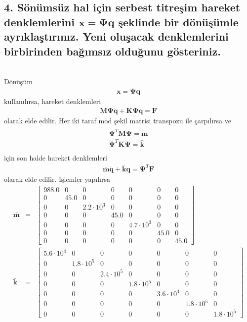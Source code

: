 \documentclass[a4paper]{report}
\begin{document}
\subsection*{4. Sönümsüz hal için serbest titreşim hareket denklemlerini $\mathbf{x}=\mathbf{\Psi}\mathbf{q}$ şeklinde bir dönüşümle ayrıklaştırınız. Yeni oluşacak denklemlerini birbirinden bağımsız olduğunu gösteriniz.}~\\
Dönüşüm
\begin{eqnarray*}
\mathbf{x}=\mathbf{\Psi}\mathbf{q}
\end{eqnarray*}
kullanılırsa, hareket denklemleri
\begin{eqnarray*}
\mathbf{M}\mathbf{\Psi}\ddot{\mathbf{q}} +\mathbf{K}\mathbf{\Psi}\mathbf{q}=\mathbf{F}
\end{eqnarray*}
olarak elde edilir. Her iki taraf mod şekil matrisi transpozu ile çarpılırsa ve
\begin{eqnarray*}
\begin{array}{c}
\mathbf{\Psi}^T\mathbf{M}{\mathbf{\Psi}}=\bar{ \mathbf{m}}\\
\mathbf{\Psi}^T\mathbf{K}{\mathbf{\Psi}}=\bar{ \mathbf{k}}\\
\end{array}
\end{eqnarray*}
için son halde hareket denklemleri
\begin{eqnarray*}
\bar{ \mathbf{m}}\ddot{\mathbf{q}} +\bar {\mathbf{k}}\mathbf{q}=\mathbf{\Psi}^T\mathbf{F}
\end{eqnarray*}
olarak elde edilir. İşlemler yapılırsa
\begin{eqnarray*}
\bar{ \mathbf{m}}&=&\left[\begin{array}{ccccccc} 988.0 & 0 & 0 & 0 & 0 & 0 & 0\\ 0 & 45.0 & 0 & 0 & 0 & 0 & 0\\ 0 & 0 & 2.2\cdot 10^3 & 0 & 0 & 0 & 0\\ 0 & 0 & 0 & 45.0 & 0 & 0 & 0\\ 0 & 0 & 0 & 0 & 4.7\cdot 10^3 & 0 & 0\\ 0 & 0 & 0 & 0 & 0 & 45.0 & 0\\ 0 & 0 & 0 & 0 & 0 & 0 & 45.0 \end{array}\right]\\
\bar{ \mathbf{k}}&=&\left[\begin{array}{ccccccc} 5.6\cdot 10^4 & 0 & 0 & 0 & 0 & 0 & 0\\ 0 & 1.8\cdot 10^5 & 0 & 0 & 0 & 0 & 0\\ 0 & 0 & 2.4\cdot 10^5 & 0 & 0 & 0 & 0\\ 0 & 0 & 0 & 1.8\cdot 10^5 & 0 & 0 & 0\\ 0 & 0 & 0 & 0 & 3.6\cdot 10^4 & 0 & 0\\ 0 & 0 & 0 & 0 & 0 & 1.8\cdot 10^5 & 0\\ 0 & 0 & 0 & 0 & 0 & 0 & 1.8\cdot 10^5 \end{array}\right]
\end{eqnarray*}
\end{document}
